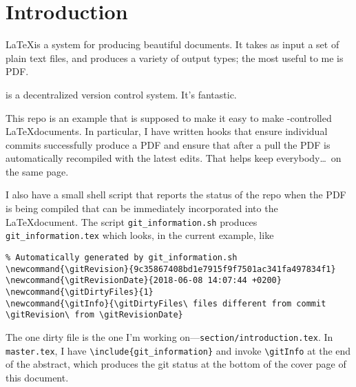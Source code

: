 \section{Introduction}

\LaTeX is a system for producing beautiful documents.
It takes as input a set of plain text files, and produces a variety of output types; the most useful to me is PDF.

\git is a decentralized version control system.
It's fantastic.

This repo is an example that is supposed to make it easy to make \git-controlled \LaTeX documents.
In particular, I have written \git hooks that ensure individual commits successfully produce a PDF and ensure that after a pull the PDF is automatically recompiled with the latest edits.
That helps keep everybody\ldots\ on the same page.

I also have a small shell script that reports the status of the repo when the PDF is being compiled that can be immediately incorporated into the \LaTeX document.
The script \texttt{git\_information.sh} produces \texttt{git\_information.tex} which looks, in the current example, like
\begin{verbatim}
% Automatically generated by git_information.sh
\newcommand{\gitRevision}{9c35867408bd1e7915f9f7501ac341fa497834f1}
\newcommand{\gitRevisionDate}{2018-06-08 14:07:44 +0200}
\newcommand{\gitDirtyFiles}{1}
\newcommand{\gitInfo}{\gitDirtyFiles\ files different from commit \gitRevision\ from \gitRevisionDate}
\end{verbatim}
The one dirty file is the one I'm working on---\texttt{section/introduction.tex}.
In \texttt{master.tex}, I have \texttt{\textbackslash include\{git\_information\}} and invoke \texttt{\textbackslash gitInfo} at the end of the abstract, which produces the git status at the bottom of the cover page of this document.
